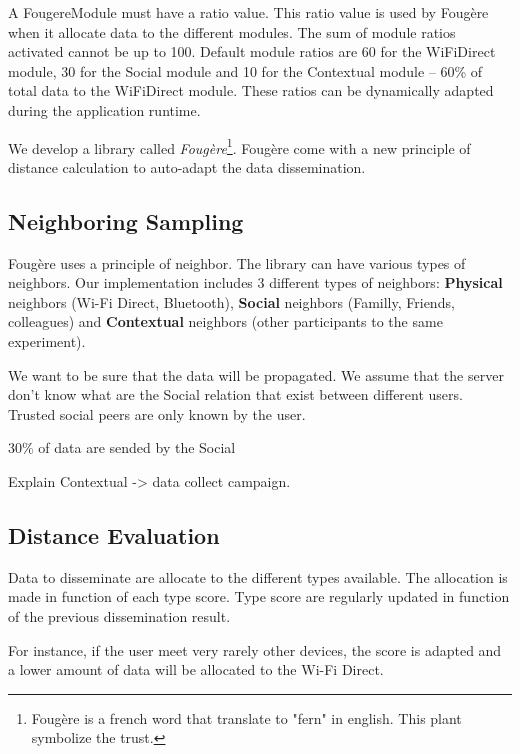 



A FougereModule must have a ratio value.
This ratio value is used by Foug\`ere when it allocate data to the different modules.
The sum of module ratios activated cannot be up to 100.
Default module ratios are 60 for the WiFiDirect module, 30 for the Social module and 10 for the Contextual module -- 60\% of total data to the WiFiDirect module.
These ratios can be dynamically adapted during the application runtime.






We develop a library called \textit{Foug\`ere}\footnote{Foug\`ere is a french word that translate to "fern" in english. This plant symbolize the trust.}.
Foug\`ere come with a new principle of distance calculation to auto-adapt the data dissemination.

\subsection{Neighboring Sampling}

Foug\`ere uses a principle of neighbor.
The library can have various types of neighbors.
Our implementation includes 3 different types of neighbors: \textbf{Physical} neighbors (Wi-Fi Direct, Bluetooth), \textbf{Social} neighbors (Familly, Friends, colleagues) and \textbf{Contextual} neighbors (other participants to the same experiment).

We want to be sure that the data will be propagated.
We assume that the server don't know what are the Social relation that exist between different users.
Trusted social peers are only known by the user.

30\% of data are sended by the Social


Explain Contextual -> data collect campaign.

\subsection{Distance Evaluation}

Data to disseminate are allocate to the different types available.
The allocation is made in function of each type score.
Type score are regularly updated in function of the previous dissemination result.

For instance, if the user meet very rarely other devices, the score is adapted and a lower amount of data will be allocated to the Wi-Fi Direct.

